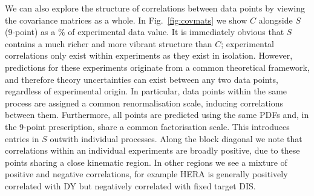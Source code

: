 We can also explore the structure of correlations between data points by viewing the covariance matrices as a whole. In Fig.~\ref{fig:covmats} we show $C$ alongside $S$ (9-point) as a $\%$ of experimental data value. It is immediately obvious that $S$ contains a much richer and more vibrant structure than $C$; experimental correlations only exist within experiments as they exist in isolation. However, predictions for these experiments originate from a common theoretical framework, and therefore theory uncertainties can exist between any two data points, regardless of experimental origin. In particular, data points within the same process are assigned a common renormalisation scale, inducing correlations between them. Furthermore, all points are predicted using the same PDFs and, in the 9-point prescription, share a common factorisation scale. This introduces entries in $S$ outwith individual processes. Along the block diagonal we note that correlations within an individual experiments are broadly positive, due to these points sharing a close kinematic region. In other regions we see a mixture of positive and negative correlations, for example HERA is generally positively correlated with DY but negatively correlated with fixed target DIS. 
